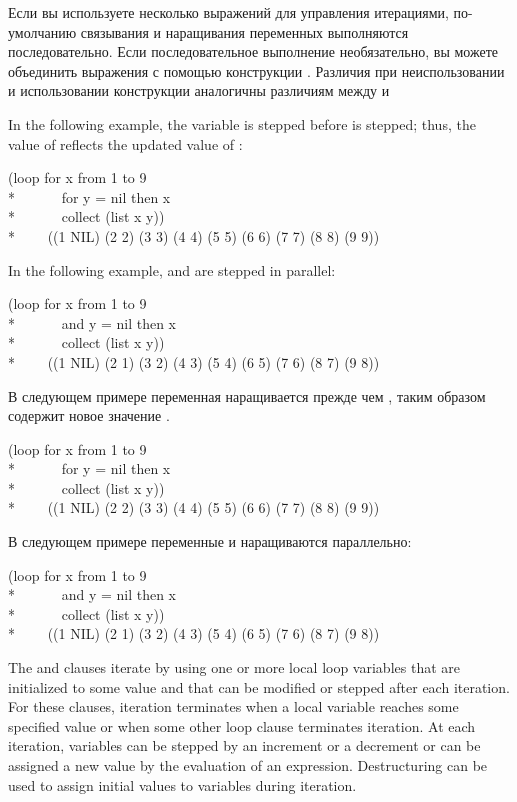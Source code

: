 Если вы используете несколько выражений для управления итерациями,
по-умолчанию связывания и наращивания переменных выполняются
последовательно. Если последовательное выполнение необязательно, вы
можете объединить выражения с помощью конструкции .  Различия
при неиспользовании и использовании конструкции  аналогичны
различиям между  и 

In the following example, the variable  is stepped
before  is stepped; thus, the value of 
reflects the updated value of :
\begin{lisp}
(loop for x from 1 to 9 \\*
~~~~~~for y = nil then x  \\*
~~~~~~collect (list x y)) \\*
~~~\EV~((1 NIL) (2 2) (3 3) (4 4) (5 5) (6 6) (7 7) (8 8) (9 9))
\end{lisp}

In the following example,  and  are stepped in parallel:
\begin{lisp}
(loop for x from 1 to 9 \\*
~~~~~~and y = nil then x \\*
~~~~~~collect (list x y)) \\*
~~~\EV~((1 NIL) (2 1) (3 2) (4 3) (5 4) (6 5) (7 6) (8 7) (9 8))
\end{lisp}

В следующем примере переменная  наращивается прежде чем
, таким образом  содержит новое значение .
\begin{lisp}
(loop for x from 1 to 9 \\*
~~~~~~for y = nil then x  \\*
~~~~~~collect (list x y)) \\*
~~~\EV~((1 NIL) (2 2) (3 3) (4 4) (5 5) (6 6) (7 7) (8 8) (9 9))
\end{lisp}

В следующем примере переменные  и  наращиваются
параллельно:
\begin{lisp}
(loop for x from 1 to 9 \\*
~~~~~~and y = nil then x \\*
~~~~~~collect (list x y)) \\*
~~~\EV~((1 NIL) (2 1) (3 2) (4 3) (5 4) (6 5) (7 6) (8 7) (9 8))
\end{lisp}

The  and  clauses iterate by using one or more local 
loop variables that are initialized to some value and that 
can be modified or stepped after each iteration.  
For these clauses, iteration terminates when a local
variable reaches some specified value or when some other loop clause
terminates iteration.  At each iteration, variables can be stepped by an
increment or a decrement or can be assigned a new value by 
the evaluation of 
an expression.  Destructuring can be used to assign initial values to 
variables during iteration.


